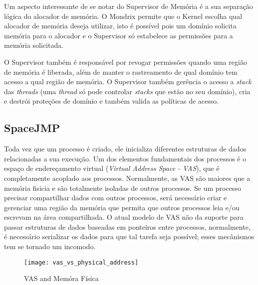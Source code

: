 Um aspecto interessante de se notar do Supervisor de Memória é a sua separação
lógica do alocador de memória. O Mondrix permite que o Kernel escolha qual
alocador de memória deseja utilizar, isto é possível pois um domínio solicita
memória para o alocador e o Supervisor só estabelece as permissões para a
memória solicitada.

O Supervisor também é responsável por revogar permissões quando uma região de
memória é liberada, além de manter o rastreamento de qual domínio tem acesso a
qual região de memória. O Supervisor também gerência o acesso a \emph{stack}
das \emph{threads} (uma \emph{thread} só pode controlar \emph{stacks} que estão
no seu domínio), cria e destrói proteções de domínio e também valida as
políticas de acesso.

\subsection{SpaceJMP}

Toda vez que um processo é criado, ele inicializa diferentes estruturas de
dados relacionadas a sua execução. Um dos elementos fundamentais dos processos
é o espaço de endereçamento virtual (\emph{Virtual Address Space - VAS}), que é
completamente acoplado aos processos. Normalmente, as VAS são maiores que a
memória fisicia e são totalmente isoladas de outros processos. Se um processo
precisar compartilhar dados com outros processos, será necessário criar e
gerenciar uma região da memória que permita que outros processos leia e/ou
escrevam na área compartilhada. O atual modelo de VAS não da suporte para
passar estruturas de dados baseadas em ponteiros entre processos, normalmente,
é necessário serializar os dados para que tal tarefa seja possível; esses
mecânismos tem se tornado um incomodo.

\begin{figure}[!h]
  \centering
  \texttt{[image: vas\_vs\_physical\_address]} 
  \caption{VAS and Memóra Física}
  \label{fig:vas_vs_physical} 
\end{figure}

